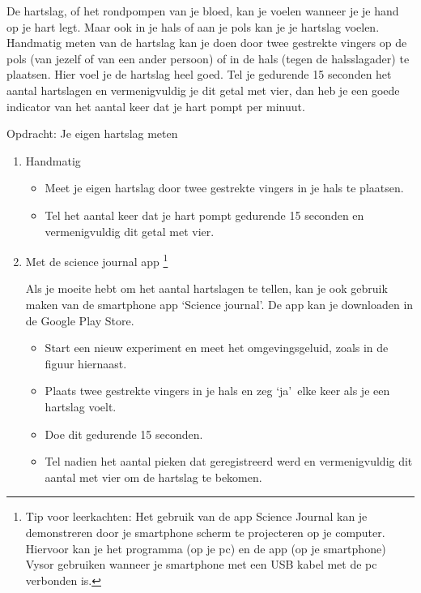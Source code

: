 De hartslag, of het rondpompen van je bloed, kan je voelen wanneer je je hand op je hart legt. Maar ook in je hals of aan je pols kan je je hartslag voelen. Handmatig meten van de hartslag kan je doen door twee gestrekte vingers op de pols (van jezelf of van een ander persoon) of in de hals (tegen de halsslagader) te plaatsen. Hier voel je de hartslag heel goed. Tel je gedurende 15 seconden het aantal hartslagen en vermenigvuldig je dit getal met vier, dan heb je een goede indicator van het aantal keer dat je hart pompt per minuut.

\begin{opdracht}{Opdracht: Je eigen hartslag meten}
	\begin{enumerate}
		\item Handmatig \\
		\begin{itemize}
			\item Meet je eigen hartslag door twee gestrekte vingers in je hals te plaatsen. 
			\item Tel het aantal keer dat je hart pompt gedurende 15 seconden en vermenigvuldig dit getal met vier.
		\end{itemize}
		\item Met de science journal app \footnote{Tip voor leerkachten:
			Het gebruik van de app Science Journal kan je demonstreren door je smartphone scherm te projecteren op je computer. Hiervoor kan je het programma (op je pc) en de app (op je smartphone) Vysor gebruiken wanneer je smartphone met een USB kabel met de pc verbonden is.}\\	
			\begin{minipage}{.6\linewidth}
				Als je moeite hebt om het aantal hartslagen te tellen, kan je ook gebruik maken van de smartphone app \textquoteleft Science journal\textquoteright. De app kan je downloaden in de Google Play Store.
				\begin{itemize}
					\item Start een nieuw experiment en meet het omgevingsgeluid, zoals in de figuur hiernaast. 
					\item Plaats twee gestrekte vingers in je hals en zeg \textquoteleft ja\textquoteright \ elke keer als je een hartslag voelt. 
					\item Doe dit gedurende 15 seconden. 
					\item Tel nadien het aantal pieken dat geregistreerd werd en vermenigvuldig dit aantal met vier om de hartslag te bekomen.
				\end{itemize}
			\end{minipage}	
			\begin{minipage}{.4\linewidth}
			\end{minipage}	
		

\end{enumerate}
\end{opdracht}

